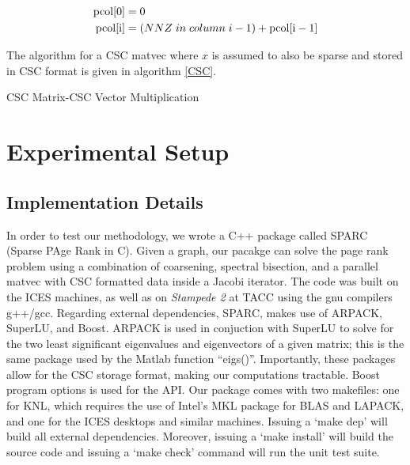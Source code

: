\documentclass[11pt]{article}
\begin{document}
\begin{equation*}
	\begin{split}
		\rm{pcol}[0] &= 0\\
		\rm{pcol}[i] &=
		(NNZ\;in\;column\;i-1)
		+ \rm{pcol}[i-1]
	\end{split}
\end{equation*}

The algorithm for a CSC matvec where $x$ is assumed to also be
sparse and stored in CSC format is given in algorithm \ref{CSC}.

\begin{algorithm}[H]
\caption{CSC Matrix-CSC Vector Multiplication}\label{CSC}
\begin{algorithmic}[1]
\EndFor
\EndParFor
{}
\EndProcedure
\end{algorithmic}
\end{algorithm}

\section{Experimental Setup}
\subsection{Implementation Details}

In order to test our methodology, we wrote a C++
package called {\rm SPARC} (Sparse PAge Rank in C). Given a
graph, our pacakge can solve the page rank problem using a combination of coarsening, spectral
bisection, and a parallel matvec with CSC formatted data inside a Jacobi
iterator. The code was built on the ICES machines, as well as on \textit{Stampede 2} at TACC using the gnu
compilers g++/gcc. Regarding external dependencies, {\rm SPARC}, makes use of
{\rm ARPACK}, {\rm SuperLU}, and {\rm Boost}. {\rm ARPACK} is used in conjuction
with {\rm SuperLU} to solve for the two least significant eigenvalues and
eigenvectors of a given
matrix; this is the same package used by the Matlab function ``eigs()''.
Importantly, these packages allow for the CSC storage format, making our
computations tractable. {\rm
Boost} program options is used for the API. Our package comes with two
makefiles: one for KNL, which requires the use of Intel's MKL package for BLAS
and LAPACK, and one for the ICES desktops and similar machines. Issuing a `make
dep' will build all external dependencies. Moreover, issuing a `make install' will
build the source code and issuing a `make check' command will run the unit test suite.  
\end{document}
